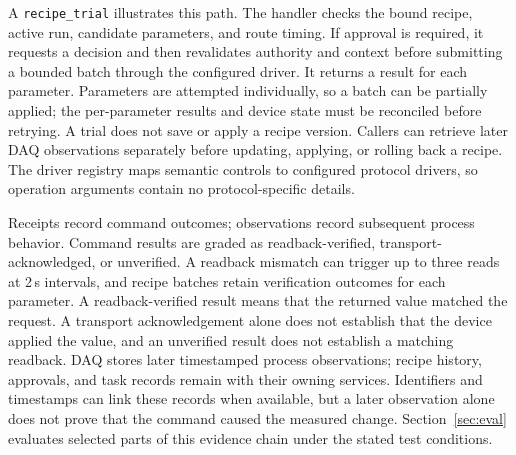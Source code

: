 A \texttt{recipe\_trial} illustrates this path. The handler checks the bound
recipe, active run, candidate parameters, and route timing. If approval is
required, it requests a decision and then revalidates authority and context
before submitting a bounded batch through the configured driver. It returns a
result for each parameter. Parameters are attempted individually, so a batch
can be partially applied; the per-parameter results and device state must be
reconciled before retrying. A trial does not save or apply a recipe version.
Callers can retrieve later DAQ observations separately before updating,
applying, or rolling back a recipe. The driver registry maps semantic controls
to configured protocol drivers, so operation arguments contain no
protocol-specific details.

Receipts record command outcomes; observations record subsequent process
behavior. Command results are graded as readback-verified,
transport-acknowledged, or unverified. A readback mismatch can trigger up to
three reads at 2\,s intervals, and recipe batches retain verification
outcomes for each parameter. A readback-verified result means that the
returned value matched the request. A transport acknowledgement alone does not
establish that the device applied the value, and an unverified result does not
establish a matching readback. DAQ stores later timestamped process
observations; recipe history, approvals, and task records remain with
their owning services. Identifiers and timestamps can link these records
when available, but a later observation alone does not prove that the command
caused the measured change. Section~\ref{sec:eval} evaluates selected parts
of this evidence chain under the stated test conditions.

